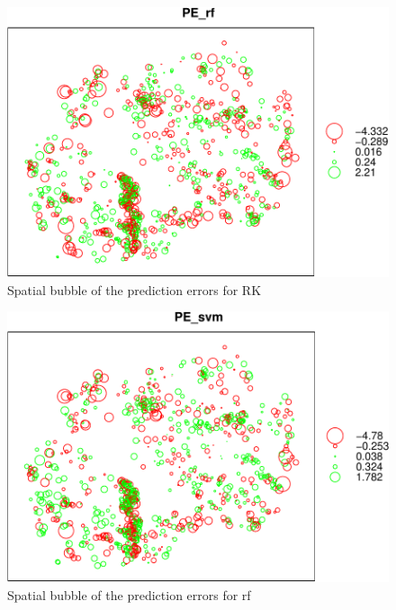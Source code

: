 \documentclass[10pt,b5paper,]{book}
\newenvironment{Shaded}{\begin{snugshade}}{\end{snugshade}}
\newcommand{\CommentTok}[1]{\textcolor[rgb]{0.56,0.35,0.01}{\textit{#1}}}
\newcommand{\DataTypeTok}[1]{\textcolor[rgb]{0.13,0.29,0.53}{#1}}
\newcommand{\DecValTok}[1]{\textcolor[rgb]{0.00,0.00,0.81}{#1}}
\newcommand{\KeywordTok}[1]{\textcolor[rgb]{0.13,0.29,0.53}{\textbf{#1}}}
\newcommand{\NormalTok}[1]{#1}
\newcommand{\OperatorTok}[1]{\textcolor[rgb]{0.81,0.36,0.00}{\textbf{#1}}}
\newcommand{\StringTok}[1]{\textcolor[rgb]{0.31,0.60,0.02}{#1}}
\theoremstyle{definition}
\theoremstyle{definition}
\theoremstyle{definition}
\theoremstyle{remark}
\begin{document}
\begin{figure}
\centering
\includegraphics{SOCMapping_files/figure-latex/unnamed-chunk-89-1.pdf}
\caption{\label{fig:unnamed-chunk-89}Spatial bubble of the prediction errors
for RK}
\end{figure}

\begin{Shaded}
\end{Shaded}

\begin{figure}
\centering
\includegraphics{SOCMapping_files/figure-latex/unnamed-chunk-90-1.pdf}
\caption{\label{fig:unnamed-chunk-90}Spatial bubble of the prediction errors
for rf}
\end{figure}
\end{document}
